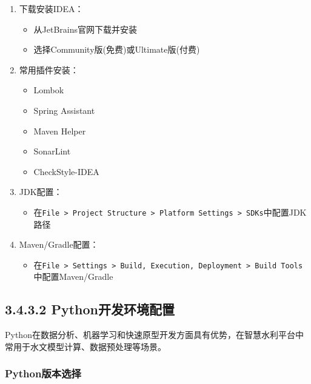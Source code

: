 \begin{enumerate}
\def\labelenumi{\arabic{enumi}.}
\tightlist
\item
  下载安装IDEA：

  \begin{itemize}
  \tightlist
  \item
    从JetBrains官网下载并安装
  \item
    选择Community版(免费)或Ultimate版(付费)
  \end{itemize}
\item
  常用插件安装：

  \begin{itemize}
  \tightlist
  \item
    Lombok
  \item
    Spring Assistant
  \item
    Maven Helper
  \item
    SonarLint
  \item
    CheckStyle-IDEA
  \end{itemize}
\item
  JDK配置：

  \begin{itemize}
  \tightlist
  \item
    在\passthrough{\lstinline!File > Project Structure > Platform Settings > SDKs!}中配置JDK路径
  \end{itemize}
\item
  Maven/Gradle配置：

  \begin{itemize}
  \tightlist
  \item
    在\passthrough{\lstinline!File > Settings > Build, Execution, Deployment > Build Tools!}中配置Maven/Gradle
  \end{itemize}
\end{enumerate}

\subsection{3.4.3.2
Python开发环境配置}\label{pythonux5f00ux53d1ux73afux5883ux914dux7f6e}

Python在数据分析、机器学习和快速原型开发方面具有优势，在智慧水利平台中常用于水文模型计算、数据预处理等场景。

\subsubsection{Python版本选择}\label{pythonux7248ux672cux9009ux62e9}

